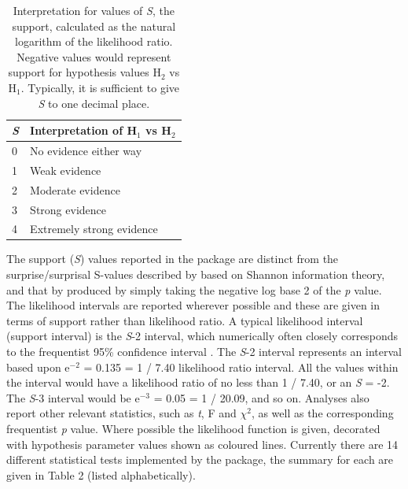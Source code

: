 \begin{table}[ht]  
\begin{center}  
\begin{tabular}{|l|l|}  
\textbf{\emph{S}} & \textbf{Interpretation of H$_{1}$ vs H$_{2}$}\\  
\hline  
0 & No evidence either way\\  
1 & Weak evidence\\
2 & Moderate evidence\\
3 & Strong evidence\\  
4 & Extremely strong evidence\\
\end{tabular}  
\caption{ Interpretation for values of \emph{S}, the support, calculated as the natural logarithm of the
likelihood ratio. Negative values would represent support for hypothesis values H$_{2}$ vs H$_{1}$. Typically, it is sufficient to
give \emph{S} to one decimal place.}  
\label{tab:Table1}  
\end{center}  
\end{table}

The support (\emph{S}) values reported in the package are distinct from the surprise/surprisal S-values described by \citep{Palm:2012} based on Shannon information theory, and that by \citep{Greenland:2019} produced by simply taking the negative log base 2 of the \emph{p} value.\\

The likelihood intervals are reported wherever possible and these are given in terms of support rather than likelihood ratio. A typical likelihood interval (support interval) is the \emph{S}-2 interval, which numerically often closely corresponds to the frequentist 95\% confidence interval \citep{Cahusac:2020}. The \emph{S}-2 interval represents an interval based upon e$^{-2}$ = 0.135 = 1 / 7.40 likelihood ratio interval. All the values within the interval would have a likelihood ratio of no less than 1 / 7.40, or an \emph{S} = -2. The \emph{S}-3 interval would be e$^{-3}$ = 0.05 = 1 / 20.09, and so on. Analyses also report other relevant statistics, such as \emph{t}, F and $\chi^{2}$, as well as the corresponding frequentist \emph{p} value.
Where possible the likelihood function is given, decorated with hypothesis parameter values shown as coloured lines. 
Currently there are 14 different statistical tests implemented by the package, the summary for each are given in Table 2 (listed alphabetically).\\ 

